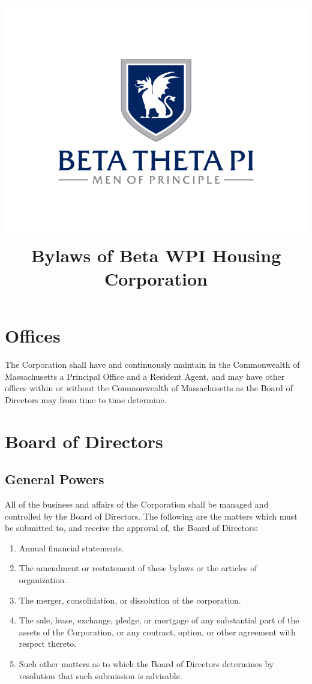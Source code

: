 \documentclass[12pt]{report}
\title{%
	\includegraphics[width=\textwidth]{btp_tone.jpg}\\[1cm]
	Bylaws of Beta WPI Housing Corporation
}
\date{\dateadopted}
\begin{document}


\begin{titlepage}
\maketitle
\end{titlepage}

\setcounter{tocdepth}{1}
\tableofcontents
\clearpage

\renewcommand\chaptername{Article}

\chapter{Offices}

The Corporation shall have and continuously maintain in the Commonwealth of Massachusetts a Principal Office and a Resident Agent, and may have other offices within or without the Commonwealth of Massachusetts as the Board of Directors may from time to time determine.

\chapter{Board of Directors}

\section{General Powers}

All of the business and affairs of the Corporation shall be managed and controlled by the Board of Directors. The following are the matters which must be submitted to, and receive the approval of, the Board of Directors:

\begin{enumerate}

\item Annual financial statements.

\item The amendment or restatement of these bylaws or the articles of organization.

\item The merger, consolidation, or dissolution of the corporation.

\item The sale, lease, exchange, pledge, or mortgage of any substantial part of the assets of the Corporation, or any contract, option, or other agreement with respect thereto.

\item Such other matters as to which the Board of Directors determines by resolution that such submission is advisable.

\end{enumerate}
\end{document}
